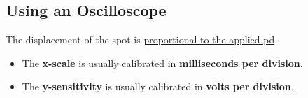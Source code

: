 \subsection{Using an Oscilloscope}

The displacement of the spot is \underline{proportional to the applied pd}.
\begin{itemize}
    \item The \textbf{x-scale} is usually calibrated in \textbf{milliseconds per division}.
    \item The \textbf{y-sensitivity} is usually calibrated in \textbf{volts per division}.
\end{itemize}
